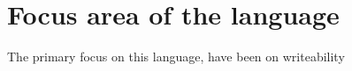 

\section{Focus area of the language}

The primary focus on this language, have been on writeability

